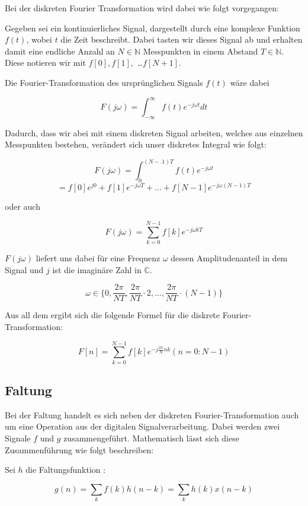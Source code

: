 \documentclass[paper=a4,fontsize=12pt,ngerman]{scrartcl}
\begin{document}
Bei der diskreten Fourier Transformation wird dabei wie folgt vorgegangen:

Gegeben sei ein kontinuierliches Signal, dargestellt durch eine komplexe Funktion $f(t)$, wobei $t$ die Zeit beschreibt. Dabei tasten wir dieses Signal ab und erhalten damit eine endliche Anzahl an $N \in \mathbb{N}$ Messpunkten in einem Abstand $T \in \mathbb{N}$. Diese notieren wir mit $f[0], f[1],$ \dots $f[N+1]$.

Die Fourier-Transformation des ursprünglichen Signals $f(t)$ wäre dabei

$$F(j \omega) =\int_{-\infty}^{\infty} f(t)e^{-j\omega t} dt $$

Dadurch, dass wir abei mit einem diskreten Signal arbeiten, welches aus einzelnen Messpunkten bestehen, verändert sich unser diskretes Integral wie folgt:

$$F(j\omega) = \int_0^{(N-.1)T} f(t)e^{-j\omega t}$$
$$= f[0]e^{j0} + f[1]e^{-j\omega T} + \dots + f[N-1]e^{-j\omega (N-1) T}$$

\cite{roberts_dft_slides}

oder auch

$$F(j\omega) = \sum_{k=0}^{N-1} f[k]e^{-j\omega kT}$$

$F(j\omega)$ liefert uns dabei für eine Frequenz $\omega$ dessen Amplitudenanteil in dem Signal und $j$ ist die imaginäre Zahl in $\mathbb{C}$.

$$\omega \in \{0, \frac{2\pi}{NT}, \frac{2\pi}{NT} \cdot 2, \dots, \frac{2\pi}{NT} \cdot (N-1)\}$$

\cite{roberts_dft_slides}

Aus all dem ergibt sich die folgende Formel für die diskrete Fourier-Transformation:

$$F[n] = \sum_{k=0}^{N-1} f[k]e^{-j\frac{2\pi}{N}nk} (n=0 : N-1)$$

\cite{roberts_dft_slides}

\subsection{Faltung}

Bei der Faltung handelt es sich neben der diskreten Fourier-Transformation auch um eine Operation aus der digitalen Signalverarbeitung. Dabei werden zwei Signale 
$f$ und $g$ zusammengeführt. Mathematisch lässt sich diese Zusammenführung wie folgt beschreiben:

Sei $h$ die Faltungsfunktion \cite{dolequez}:

$$g(n) = \sum_{k} f(k) h(n-k) = \sum_{k} h(k) x (n-k)$$
\end{document}
